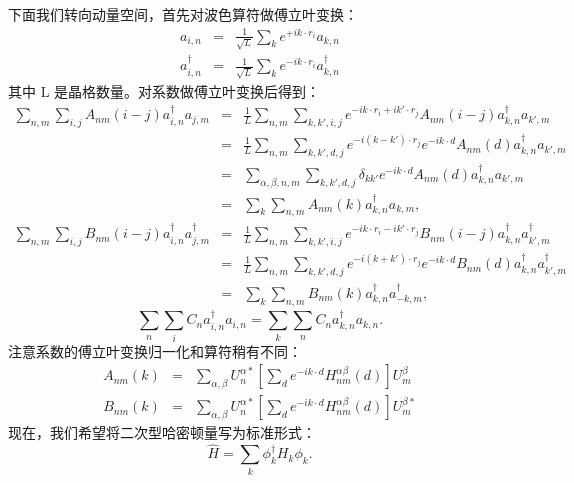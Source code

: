 \documentclass[UTF8]{ctexart}
\begin{document}
下面我们转向动量空间，首先对波色算符做傅立叶变换：
\begin{eqnarray}
a_{i,n} & = & \frac{1}{\sqrt{L}}\sum_{k}e^{+ik\cdot r_{i}}a_{k,n}\\
a_{i,n}^{\dagger} & = & \frac{1}{\sqrt{L}}\sum_{k}e^{-ik\cdot r_{i}}a_{k,n}^{\dagger}
\end{eqnarray}
其中 L 是晶格数量。对系数做傅立叶变换后得到：
\begin{eqnarray}
\sum_{n,m}\sum_{i,j}A_{nm}\left(i-j\right)a_{i,n}^{\dagger}a_{j,m} & = & \frac{1}{L}\sum_{n,m}\sum_{k,k',i,j}e^{-ik\cdot r_{i}+ik'\cdot r_{j}}A_{nm}\left(i-j\right)a_{k,n}^{\dagger}a_{k',m}\nonumber \\
 & = & \frac{1}{L}\sum_{n,m}\sum_{k,k',d,j}e^{-i\left(k-k'\right)\cdot r_{j}}e^{-ik\cdot d}A_{nm}\left(d\right)a_{k,n}^{\dagger}a_{k',m}\nonumber \\
 & = & \sum_{\alpha,\beta,n,m}\sum_{k,k',d,j}\delta_{kk'}e^{-ik\cdot d}A_{nm}\left(d\right)a_{k,n}^{\dagger}a_{k',m}\nonumber \\
 & = & \sum_{k}\sum_{n,m}A_{nm}\left(k\right)a_{k,n}^{\dagger}a_{k,m},
\end{eqnarray}
\begin{eqnarray}
\sum_{n,m}\sum_{i,j}B_{nm}\left(i-j\right)a_{i,n}^{\dagger}a_{j,m}^{\dagger} & = & \frac{1}{L}\sum_{n,m}\sum_{k,k',i,j}e^{-ik\cdot r_{i}-ik'\cdot r_{j}}B_{nm}\left(i-j\right)a_{k,n}^{\dagger}a_{k',m}^{\dagger}\nonumber \\
 & = & \frac{1}{L}\sum_{n,m}\sum_{k,k',d,j}e^{-i\left(k+k'\right)\cdot r_{j}}e^{-ik\cdot d}B_{nm}\left(d\right)a_{k,n}^{\dagger}a_{k',m}^{\dagger}\nonumber \\
 & = & \sum_{k}\sum_{n,m}B_{nm}\left(k\right)a_{k,n}^{\dagger}a_{-k,m}^{\dagger},
\end{eqnarray}
\begin{equation}
\sum_{n}\sum_{i}C_{n}a_{i,n}^{\dagger}a_{i,n}=\sum_{k}\sum_{n}C_{n}a_{k,n}^{\dagger}a_{k,n}.
\end{equation}
注意系数的傅立叶变换归一化和算符稍有不同：
\begin{eqnarray}
A_{nm}\left(k\right) & = & \sum_{\alpha,\beta}U_{n}^{\alpha*}\left[\sum_{d}e^{-ik\cdot d}H_{nm}^{\alpha\beta}\left(d\right)\right]U_{m}^{\beta}\\
B_{nm}\left(k\right) & = & \sum_{\alpha,\beta}U_{n}^{\alpha*}\left[\sum_{d}e^{-ik\cdot d}H_{nm}^{\alpha\beta}\left(d\right)\right]U_{m}^{\beta*}
\end{eqnarray}
现在，我们希望将二次型哈密顿量写为标准形式：
\begin{equation}
\hat{H}=\sum_{k}\phi_{k}^{\dagger}H_{k}\phi_{k}.
\end{equation}
\end{document}
